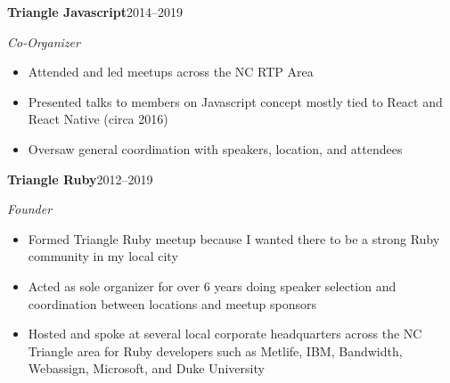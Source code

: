 \documentclass[10pt,letterpaper]{article}
\newcommand{\resumeentry}[4]{%
  \par\addvspace{6pt}
  {\bfseries #1}\hfill #2\par
  \textit{#3}\hfill \textit{#4}\par
}
\newenvironment{resumebullets}{%
  \begin{itemize}[
    leftmargin=1.5em,
    label=\textbullet,
    itemsep=1pt,
    parsep=0pt,
    topsep=3pt,
    partopsep=0pt
  ]
}{%
  \end{itemize}
}
\begin{document}
\resumeentry{Triangle Javascript}{2014--2019}
  {Co-Organizer}{}
\begin{resumebullets}
  \item Attended and led meetups across the NC RTP Area
  \item Presented talks to members on Javascript concept mostly tied to React and React Native (circa 2016)
  \item Oversaw general coordination with speakers, location, and attendees
\end{resumebullets}

\resumeentry{Triangle Ruby}{2012--2019}
  {Founder}{}
\begin{resumebullets}
  \item Formed Triangle Ruby meetup because I wanted there to be a strong Ruby community in my local city
  \item Acted as sole organizer for over 6 years doing speaker selection and coordination between locations and meetup sponsors
  \item Hosted and spoke at several local corporate headquarters across the NC Triangle area for Ruby developers such as Metlife, IBM, Bandwidth, Webassign, Microsoft, and Duke University
\end{resumebullets}
\end{document}
